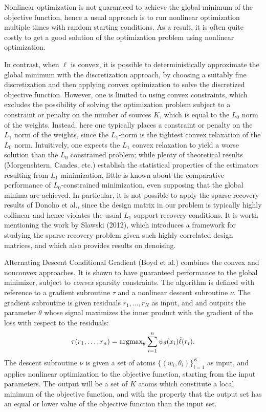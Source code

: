 \documentclass[11pt]{article}
\begin{document}
Nonlinear optimization is not guaranteed to achieve the global minimum
of the objective function, hence a usual approach is to run nonlinear
optimization multiple times with random starting conditions.  As a
result, it is often quite costly to get a good solution of the
optimization problem using nonlinear optimization.

In contrast, when $\ell$ is convex, it is possible to
deterministically approximate the global minimum with the
discretization approach, by choosing a suitably fine discretization
and then applying convex optimization to solve the discretized
objective function.  However, one is limited to using convex
constraints, which excludes the possibility of solving the
optimization problem subject to a constraint or penalty on the number
of sources $K$, which is equal to the $L_0$ norm of the weights.
Instead, here one typically places a constraint or penalty on the
$L_1$ norm of the weights, since the $L_1$-norm is the tightest convex
relaxation of the $L_0$ norm.  Intuitively, one expects the $L_1$
convex relaxation to yield a worse solution than the $L_0$ constrained
problem; while plenty of theoretical results (Morgenshtern, Candes,
etc.) establish the statistical properties of the estimators resulting
from $L_1$ minimization, little is known about the comparative
performance of $L_0$-constrained minimization, even supposing that the
global minima are achieved.  In particular, it is not possible to
apply the sparse recovery results of Donoho et al., since the design
matrix in our problem is typically highly collinear and hence violates
the usual $L_1$ support recovery conditions.  It is worth mentioning
the work by Slawski (2012), which introduces a framework for studying
the sparse recovery problem given such highly correlated design
matrices, and which also provides results on denoising.

Alternating Descent Conditional Gradient (Boyd et al.) combines the
convex and nonconvex approaches.  It is shown to have guaranteed
performance to the global minimizer, subject to \emph{convex} sparsity
constraints.  The algorithm is defined with reference to a gradient
subroutine $\tau$ and a nonlinear descent subroutine $\nu$.  The
gradient subroutine is given residuals $r_1,\hdots, r_N$ as input, and
and outputs the parameter $\theta$ whose signal maximizes the inner
product with the gradient of the loss with respect to the residuals:
\[
\tau(r_1,\hdots, r_n) = \text{argmax}_\theta \sum_{i=1}^n \psi_\theta(x_i) \dot{\ell}(r_i).
\]
The descent subroutine $\nu$ is given a set of atoms
$\{(w_i,\theta_i)\}_{i=1}^K$ as input, and applies nonlinear
optimization to the objective function, starting from the input
parameters.  The output will be a set of $K$ atoms
which constitute a local minimum of the objective function, and with
the property that the output set has an equal or lower value of the
objective function than the input set.
\end{document}
